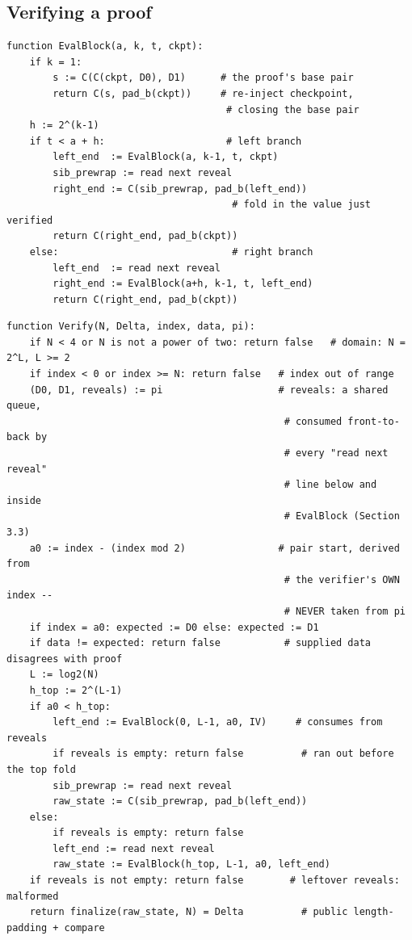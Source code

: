 \subsection{Verifying a proof}

\begin{algorithm}[H]
\caption{$\textsc{EvalBlock}(a, k, t, \mathit{ckpt})$ -- verifier, symmetric to \textsc{Recurse}}
\label{alg:evalblock}
\begin{lstlisting}[style=pseudo]
function EvalBlock(a, k, t, ckpt):
    if k = 1:
        s := C(C(ckpt, D0), D1)      # the proof's base pair
        return C(s, pad_b(ckpt))     # re-inject checkpoint,
                                      # closing the base pair
    h := 2^(k-1)
    if t < a + h:                     # left branch
        left_end  := EvalBlock(a, k-1, t, ckpt)
        sib_prewrap := read next reveal
        right_end := C(sib_prewrap, pad_b(left_end))
                                       # fold in the value just verified
        return C(right_end, pad_b(ckpt))
    else:                              # right branch
        left_end  := read next reveal
        right_end := EvalBlock(a+h, k-1, t, left_end)
        return C(right_end, pad_b(ckpt))
\end{lstlisting}
\end{algorithm}

\begin{algorithm}[H]
\caption{$\textsc{Verify}(N, \Delta, \mathit{index}, \mathit{data}, \pi)$ -- top-level verifier}
\begin{lstlisting}[style=pseudo]
function Verify(N, Delta, index, data, pi):
    if N < 4 or N is not a power of two: return false   # domain: N = 2^L, L >= 2
    if index < 0 or index >= N: return false   # index out of range
    (D0, D1, reveals) := pi                    # reveals: a shared queue,
                                                # consumed front-to-back by
                                                # every "read next reveal"
                                                # line below and inside
                                                # EvalBlock (Section 3.3)
    a0 := index - (index mod 2)                # pair start, derived from
                                                # the verifier's OWN index --
                                                # NEVER taken from pi
    if index = a0: expected := D0 else: expected := D1
    if data != expected: return false           # supplied data disagrees with proof
    L := log2(N)
    h_top := 2^(L-1)
    if a0 < h_top:
        left_end := EvalBlock(0, L-1, a0, IV)     # consumes from reveals
        if reveals is empty: return false          # ran out before the top fold
        sib_prewrap := read next reveal
        raw_state := C(sib_prewrap, pad_b(left_end))
    else:
        if reveals is empty: return false
        left_end := read next reveal
        raw_state := EvalBlock(h_top, L-1, a0, left_end)
    if reveals is not empty: return false        # leftover reveals: malformed
    return finalize(raw_state, N) = Delta          # public length-padding + compare
\end{lstlisting}
\end{algorithm}

